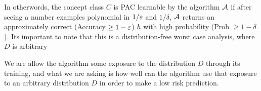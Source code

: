  In otherwords, the concept class $C$ is PAC learnable by the algorithm $\mathcal A$ if after seeing a number examples polynomial in
$1/ \varepsilon$ and $1 / \delta$, $\mathcal A$ returns an approximately correct (Accuracy $\geq 1- \varepsilon$) $h$ with high probability (Prob $\geq 1-\delta$).
Its important to note that this is a distribution-free worst case analysis, where $D$ is arbitrary

We are allow the algorithm some exposure to the distribution $D$ through its training, and  what we are asking is how well can the algorithm use that exposure to an arbitrary distribution $D$ in order to make a low risk prediction. 
    